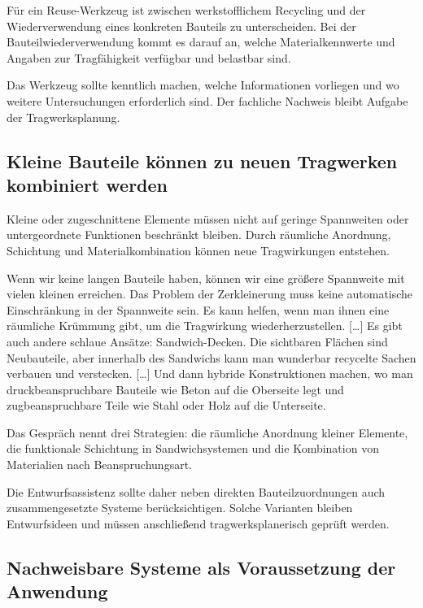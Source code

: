 Für ein Reuse-Werkzeug ist zwischen werkstofflichem Recycling und der Wiederverwendung eines konkreten Bauteils zu unterscheiden. Bei der Bauteilwiederverwendung kommt es darauf an, welche Materialkennwerte und Angaben zur Tragfähigkeit verfügbar und belastbar sind.

Das Werkzeug sollte kenntlich machen, welche Informationen vorliegen und wo weitere Untersuchungen erforderlich sind. Der fachliche Nachweis bleibt Aufgabe der Tragwerksplanung.

\subsection{Kleine Bauteile können zu neuen Tragwerken kombiniert werden}

Kleine oder zugeschnittene Elemente müssen nicht auf geringe Spannweiten oder untergeordnete Funktionen beschränkt bleiben. Durch räumliche Anordnung, Schichtung und Materialkombination können neue Tragwirkungen entstehen.

\begin{Blockquote}
Wenn wir keine langen Bauteile haben, können wir eine größere Spannweite mit vielen kleinen erreichen. Das Problem der Zerkleinerung muss keine automatische Einschränkung in der Spannweite sein. Es kann helfen, wenn man ihnen eine räumliche Krümmung gibt, um die Tragwirkung wiederherzustellen. […] Es gibt auch andere schlaue Ansätze: Sandwich-Decken. Die sichtbaren Flächen sind Neubauteile, aber innerhalb des Sandwichs kann man wunderbar recycelte Sachen verbauen und verstecken. […] Und dann hybride Konstruktionen machen, wo man druckbeanspruchbare Bauteile wie Beton auf die Oberseite legt und zugbeanspruchbare Teile wie Stahl oder Holz auf die Unterseite.
\end{Blockquote}

Das Gespräch nennt drei Strategien: die räumliche Anordnung kleiner Elemente, die funktionale Schichtung in Sandwichsystemen und die Kombination von Materialien nach Beanspruchungsart.

Die Entwurfsassistenz sollte daher neben direkten Bauteilzuordnungen auch zusammengesetzte Systeme berücksichtigen. Solche Varianten bleiben Entwurfsideen und müssen anschließend tragwerksplanerisch geprüft werden.

\subsection{Nachweisbare Systeme als Voraussetzung der Anwendung}

